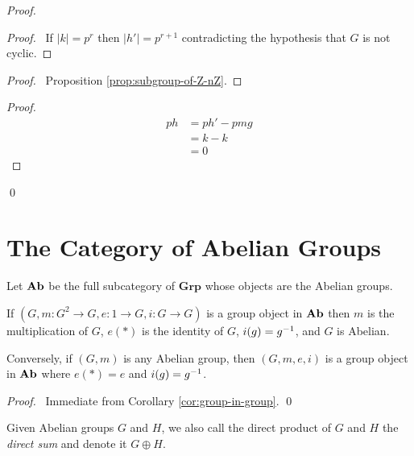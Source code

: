 \begin{proof}
\pf
{}
\begin{proof}
	\pf\ If $|k| = p^r$ then $|h'| = p^{r+1}$ contradicting the hypothesis that $G$ is not cyclic.
\end{proof}
\begin{proof}
	\pf\ Proposition \ref{prop:subgroup-of-Z-nZ}.
\end{proof}
\begin{proof}
	\pf
	\begin{align*}
		ph & = ph' - pmg \\
		& = k-k \\
		& = 0
	\end{align*}
\end{proof}
\qed
\end{proof}

\section{The Category of Abelian Groups}

\begin{df}
    Let $\mathbf{Ab}$ be the full subcategory of $\mathbf{Grp}$ whose objects are the Abelian groups.
\end{df}

\begin{prop}
If $(G, m : G^2 \rightarrow G, e : 1 \rightarrow G, i : G \rightarrow G)$ is a group object in $\mathbf{Ab}$ then $m$ is the multiplication of $G$, $e(*)$ is the identity of $G$, $i(g) = {g}^{-1}$, and $G$ is Abelian.

Conversely, if $(G, m)$ is any Abelian group, then $(G,m,e,i)$ is a group object in $\mathbf{Ab}$ where $e(*) = e$ and $i(g) = {g}^{-1}$.
\end{prop}

\begin{proof}
\pf\ Immediate from Corollary \ref{cor:group-in-group}. \qed
\end{proof}

\begin{df}
    Given Abelian groups $G$ and $H$, we also call the direct product of $G$ and $H$ the \emph{direct sum} and denote it $G \oplus H$.
\end{df}

